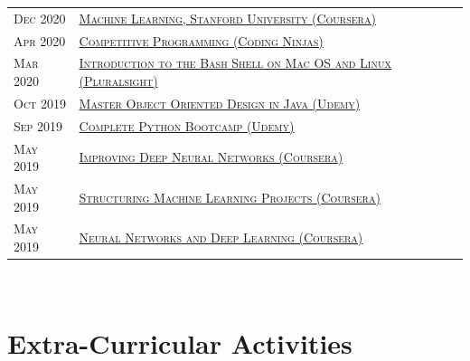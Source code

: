 \documentclass[a4paper,10pt]{article} %
\begin{document}
\begin{tabular}{ll}
\textsc{Dec 2020} & \href{https://www.coursera.org/account/accomplishments/verify/ZF4WLZWMJR3U}{\textsc{Machine Learning, Stanford University (Coursera)}}\\
\textsc{Apr 2020} & \href{https://ninjasfiles.s3.amazonaws.com/certificate643308086b235198c8d9aa73fa674fe417597e.pdf}{\textsc{Competitive Programming (Coding Ninjas)}}\\
\textsc{Mar 2020} & \href{https://vaibhavkasturia.com/certificate/introduction-to-the-bash-shell-on-macos-and-linux-vaibhav-kasturia.pdf}{\textsc{Introduction to the Bash Shell on Mac OS and Linux (Pluralsight)}}\\
\textsc{Oct 2019} & \href{https://www.udemy.com/certificate/UC-1EV6KK7F/}{\textsc{Master Object Oriented Design in Java (Udemy)}}\\
\textsc{Sep 2019} & \href{https://www.udemy.com/certificate/UC-P7AJYXY6/}{\textsc{Complete Python Bootcamp (Udemy)}}\\
\textsc{May 2019} & \href{https://www.coursera.org/account/accomplishments/verify/XN25BG7WGAM3}{\textsc{Improving Deep Neural Networks (Coursera)}}\\
\textsc{May 2019} & \href{https://www.coursera.org/account/accomplishments/certificate/LWCFY27WJB9R}{\textsc{Structuring Machine Learning Projects (Coursera)}}\\
\textsc{May 2019} & \href{https://www.coursera.org/account/accomplishments/verify/KCVQACF5SKEM}{\textsc{Neural Networks and Deep Learning (Coursera)}}\\
\end{tabular}
\\

\section{Extra-Curricular Activities}
\end{document}
